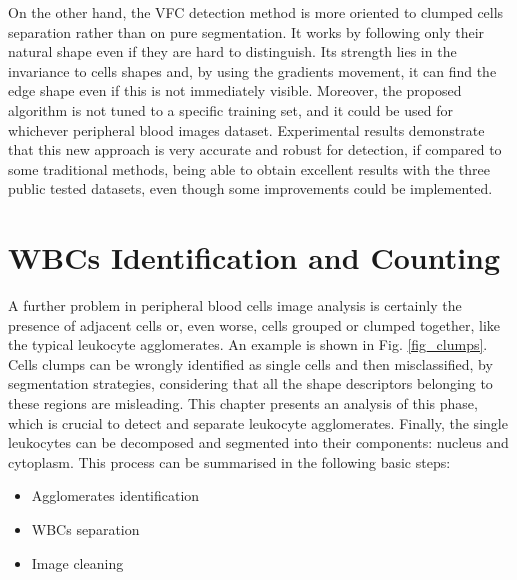 \documentclass[final,a4paper,12pt,english]{UnicaPhdThesis3}
\begin{document}
{On the other hand, the VFC detection method is more oriented to clumped cells separation rather than on pure segmentation. It works by following only their natural shape even if they are hard to distinguish. Its strength lies in the invariance to cells shapes and, by using the gradients movement, it can find the edge shape even if this is not immediately visible.
Moreover, the proposed algorithm is not tuned to a specific training set, and it could be used for whichever peripheral blood images dataset. 
Experimental results demonstrate that this new approach is very accurate and robust for detection, if compared to some traditional methods, being able to obtain excellent results with the three public tested datasets, even though some improvements could be implemented.

\chapter{WBCs Identification and Counting} 
A further problem in peripheral blood cells image analysis is certainly the presence of adjacent cells or, even worse, cells grouped or clumped together, like the typical leukocyte agglomerates. An example is shown in Fig. \ref{fig_clumps}. Cells clumps can be wrongly identified as single cells and then misclassified, by segmentation strategies, considering that all the shape descriptors belonging to these regions are misleading. 
This chapter presents an analysis of this phase, which is crucial to detect and separate leukocyte agglomerates. Finally, the single leukocytes can be decomposed and segmented into their components: nucleus and cytoplasm. This process can be summarised in the following basic steps:
\begin{itemize}
\item Agglomerates identification 
\item WBCs separation
\item Image cleaning
\end{itemize}

}
\end{document}
